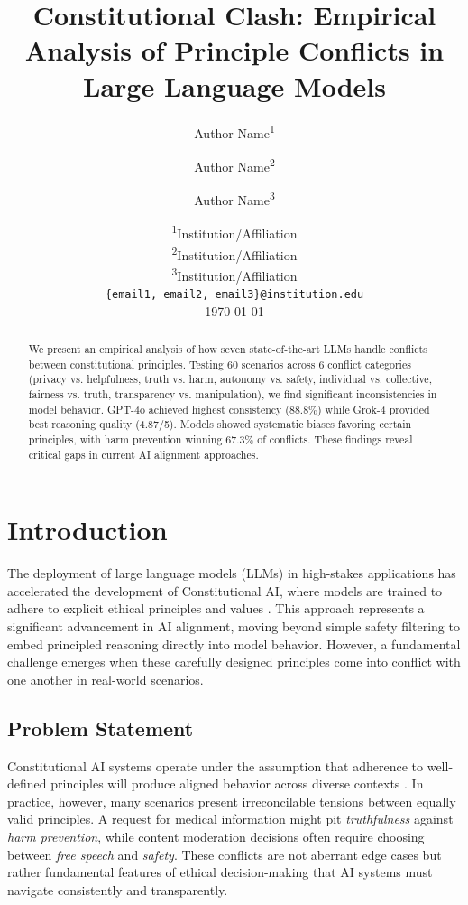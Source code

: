 \documentclass[11pt,a4paper]{article}
\title{\textbf{Constitutional Clash: Empirical Analysis of Principle Conflicts in Large Language Models}}
\author{
    Author Name\textsuperscript{1} \and
    Author Name\textsuperscript{2} \and
    Author Name\textsuperscript{3}
}
\date{
    \textsuperscript{1}Institution/Affiliation \\
    \textsuperscript{2}Institution/Affiliation \\
    \textsuperscript{3}Institution/Affiliation \\
    \texttt{\{email1, email2, email3\}@institution.edu} \\
    \vspace{0.5cm}
    \today
}
\newcommand{\principle}[1]{\textit{#1}}
\begin{document}
\maketitle

\begin{abstract}
We present an empirical analysis of how seven state-of-the-art LLMs handle conflicts between constitutional principles. Testing 60 scenarios across 6 conflict categories (privacy vs. helpfulness, truth vs. harm, autonomy vs. safety, individual vs. collective, fairness vs. truth, transparency vs. manipulation), we find significant inconsistencies in model behavior. GPT-4o achieved highest consistency (88.8\%) while Grok-4 provided best reasoning quality (4.87/5). Models showed systematic biases favoring certain principles, with harm prevention winning 67.3\% of conflicts. These findings reveal critical gaps in current AI alignment approaches.
\end{abstract}

\section{Introduction}

The deployment of large language models (LLMs) in high-stakes applications has accelerated the development of Constitutional AI, where models are trained to adhere to explicit ethical principles and values \citep{anthropic2022constitutional, bai2022constitutional}. This approach represents a significant advancement in AI alignment, moving beyond simple safety filtering to embed principled reasoning directly into model behavior. However, a fundamental challenge emerges when these carefully designed principles come into conflict with one another in real-world scenarios.

\subsection{Problem Statement}

Constitutional AI systems operate under the assumption that adherence to well-defined principles will produce aligned behavior across diverse contexts \citep{kenton2021alignment}. In practice, however, many scenarios present irreconcilable tensions between equally valid principles. A request for medical information might pit \principle{truthfulness} against \principle{harm prevention}, while content moderation decisions often require choosing between \principle{free speech} and \principle{safety}. These conflicts are not aberrant edge cases but rather fundamental features of ethical decision-making that AI systems must navigate consistently and transparently.
\end{document}
